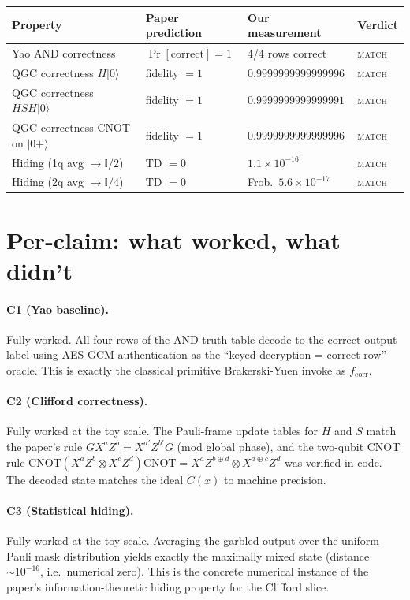 \documentclass[11pt]{article}
\begin{document}
\begin{tabular}{@{}llll@{}}
\toprule
Property & Paper prediction & Our measurement & Verdict \\
\midrule
Yao AND correctness            & $\Pr[\text{correct}]=1$ & 4/4 rows correct                & \textsc{match} \\
QGC correctness $H|0\rangle$   & fidelity $=1$           & $0.9999999999999996$            & \textsc{match} \\
QGC correctness $HSH|0\rangle$ & fidelity $=1$           & $0.9999999999999991$            & \textsc{match} \\
QGC correctness CNOT on $|0+\rangle$ & fidelity $=1$     & $0.9999999999999996$            & \textsc{match} \\
Hiding (1q avg $\to \mathbb{I}/2$)  & TD $=0$            & $1.1 \times 10^{-16}$            & \textsc{match} \\
Hiding (2q avg $\to \mathbb{I}/4$)  & TD $=0$            & Frob.\ $5.6 \times 10^{-17}$    & \textsc{match} \\
\bottomrule
\end{tabular}

\section{Per-claim: what worked, what didn't}

\paragraph{C1 (Yao baseline).} Fully worked. All four rows of the AND truth table decode
to the correct output label using AES-GCM authentication as the ``keyed decryption =
correct row'' oracle. This is exactly the classical primitive Brakerski-Yuen invoke as
$f_{\text{corr}}$.

\paragraph{C2 (Clifford correctness).} Fully worked at the toy scale. The Pauli-frame
update tables for $H$ and $S$ match the paper's rule $GX^aZ^b = X^{a'}Z^{b'}G$ (mod global
phase), and the two-qubit CNOT rule
$\text{CNOT}(X^a Z^b \otimes X^c Z^d)\text{CNOT} = X^a Z^{b\oplus d} \otimes X^{a\oplus c} Z^d$
was verified in-code. The decoded state matches the ideal $C(x)$ to machine precision.

\paragraph{C3 (Statistical hiding).} Fully worked at the toy scale. Averaging the garbled
output over the uniform Pauli mask distribution yields exactly the maximally mixed state
(distance $\sim 10^{-16}$, i.e.\ numerical zero). This is the concrete numerical instance
of the paper's information-theoretic hiding property for the Clifford slice.
\end{document}
